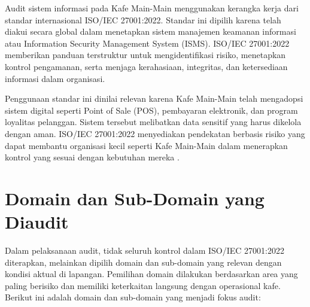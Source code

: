 \documentclass[12pt, a4paper]{report}
\begin{document}
Audit sistem informasi pada Kafe Main-Main menggunakan kerangka kerja dari standar internasional ISO/IEC 27001:2022. Standar ini dipilih karena telah diakui secara global dalam menetapkan sistem manajemen keamanan informasi atau Information Security Management System (ISMS). ISO/IEC 27001:2022 memberikan panduan terstruktur untuk mengidentifikasi risiko, menetapkan kontrol pengamanan, serta menjaga kerahasiaan, integritas, dan ketersediaan informasi dalam organisasi.

Penggunaan standar ini dinilai relevan karena Kafe Main-Main telah mengadopsi sistem digital seperti Point of Sale (POS), pembayaran elektronik, dan program loyalitas pelanggan. Sistem tersebut melibatkan data sensitif yang harus dikelola dengan aman. ISO/IEC 27001:2022 menyediakan pendekatan berbasis risiko yang dapat membantu organisasi kecil seperti Kafe Main-Main dalam menerapkan kontrol yang sesuai dengan kebutuhan mereka \cite{iso27001}.

\section{Domain dan Sub-Domain yang Diaudit}

Dalam pelaksanaan audit, tidak seluruh kontrol dalam ISO/IEC 27001:2022 diterapkan, melainkan dipilih domain dan sub-domain yang relevan dengan kondisi aktual di lapangan. Pemilihan domain dilakukan berdasarkan area yang paling berisiko dan memiliki keterkaitan langsung dengan operasional kafe. Berikut ini adalah domain dan sub-domain yang menjadi fokus audit:
\end{document}

